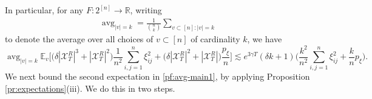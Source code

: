 \documentclass[11pt,reqno]{amsart}
\numberwithin{equation}{section}
\theoremstyle{definition}
\def\E{{\mathbb E}}
\def\R{{\mathbb R}}
\def\X{{\mathcal X}}
\DeclareMathOperator*{\avg}{avg}
\begin{document}
In particular, for any $F: 2^{[n]} \to \R$, writing
	\begin{align} \label{eq:average.notation}
		\avg_{|v|=k}=\frac{1}{{n \choose k}} \sum_{v\subset [n] : |v|=k}
	\end{align}
	 to denote the average over all choices of $v \subset [n]$ of cardinality $k$, we have
\begin{equation}
\avg_{|v|=k}\E_v\Big[\big(\delta |\X_T^{R}|^3+|\X_T^{R}|^2\big)\frac{1}{n^2}\sum_{i,j=1}^n\xi_{ij}^2 + \big(\delta |\X_T^{R}|^2 + |\X_T^{R}|\big)\frac{p_\xi}{n}\Big] \lesssim e^{3\gamma T}(\delta k+1)\bigg(\frac{k^2}{n^2}\sum_{i,j=1}^n\xi_{ij}^2 + \frac{k}{n}p_\xi\bigg). \label{pf:avg-main2}
\end{equation}
We next bound the second expectation in \eqref{pf:avg-main1}, by applying Proposition \ref{pr:expectations}(iii). We do this in two steps.

{ \ }
\end{document}
